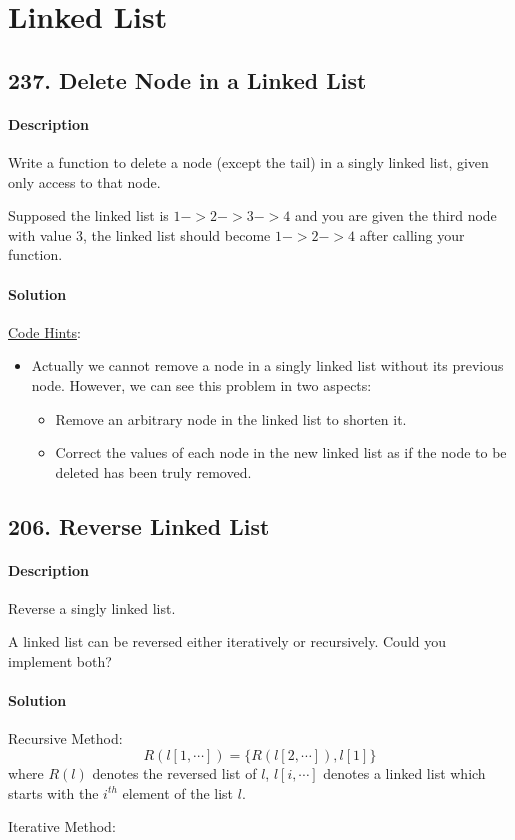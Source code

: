 \section{Linked List}

\subsection{237. Delete Node in a Linked List}

\paragraph{\color{white} \colorbox{Mahogany}{Description}}
Write a function to delete a node (except the tail) in a singly linked list, given only access to that node.

Supposed the linked list is $1 -> 2 -> 3 -> 4$ and you are given the third node with value 3, the linked list should become $1 -> 2 -> 4$ after calling your function.

\paragraph{\color{white} \colorbox{OliveGreen}{Solution}}
\underline{Code Hints}:
\begin{itemize}
    \item Actually we cannot remove a node in a singly linked list without its previous node. However, we can see this problem in two aspects:
    \begin{itemize}
        \item Remove an arbitrary node in the linked list to shorten it.
        \item Correct the values of each node in the new linked list as if the node to be deleted has been truly removed.
    \end{itemize}
\end{itemize}

\subsection{206. Reverse Linked List}

\paragraph{\color{white} \colorbox{Mahogany}{Description}}
Reverse a singly linked list.

A linked list can be reversed either iteratively or recursively. Could you implement both?

\paragraph{\color{white} \colorbox{OliveGreen}{Solution}}
Recursive Method:
$$R(l[1,\cdots])=\{R(l[2,\cdots]),l[1]\}$$
where $R(l)$ denotes the reversed list of $l$, $l[i,\cdots]$ denotes a linked list which starts with the $i^{th}$ element of the list $l$.

Iterative Method:
